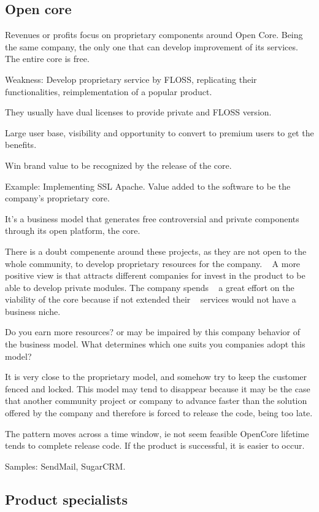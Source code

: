 \subsection{Open core}

Revenues or profits focus on proprietary components around
Open Core. Being the same company, the only one that can develop
improvement of its services. The entire core is free.

Weakness: Develop proprietary service by FLOSS, replicating their
functionalities, reimplementation of a popular product.

They usually have dual licenses to provide private and FLOSS version.

Large user base, visibility and opportunity to convert to premium users to get 
the benefits.

Win brand value to be recognized by the release of the core.

Example: Implementing SSL Apache. 
Value added to the software to be the company's proprietary core.

It's a business model that generates free controversial and private components
 through its open platform, the core.

There is a doubt compenente around these projects, as they are not open to the
  whole community, to develop proprietary resources for the company.
 
A more positive view is that attracts different companies for
invest in the product to be able to develop private modules. The company spends
  a great effort on the viability of the core because if not extended their
  services would not have a business niche.

Do you earn more resources? or may be impaired by this company
behavior of the business model. What determines which one suits you
companies adopt this model?

It is very close to the proprietary model, and somehow try to keep the customer 
fenced and locked. This model may tend to disappear because it may be the case 
that another community project or company to advance faster than the solution 
offered by the company and therefore is forced to release the code, being
 too late.

The pattern moves across a time window, ie not seem feasible OpenCore lifetime 
tends to complete release code. If the product is successful, 
it is easier to occur.

Samples: SendMail, SugarCRM.

\subsection{Product specialists}

